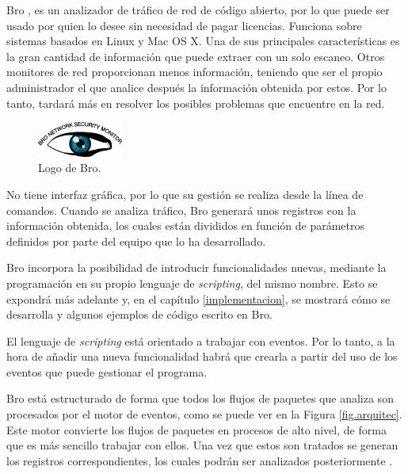 Bro \cite{broindex}, es un analizador de tráfico de red de código abierto, por lo que puede ser usado por quien lo desee 
sin necesidad de pagar licencias. Funciona sobre sistemas basados en Linux y 
Mac OS X. Una de sus principales características es la gran cantidad de información que puede extraer con un solo 
escaneo. Otros monitores de red proporcionan menos información, teniendo que ser el propio administrador el que 
analice después la información obtenida por estos. Por lo tanto, tardará más en resolver los posibles problemas 
que encuentre en la red.

\begin{figure}[H]
  \includegraphics[width=0.25\textwidth]{imagenes/logo-bro.png}
  \centering
  \caption{Logo de Bro.}
\end{figure}

\intro No tiene interfaz gráfica, por lo que su gestión se realiza desde la línea de comandos. Cuando se analiza 
tráfico, Bro generará unos registros con la información obtenida, los cuales están divididos en función de parámetros definidos por 
parte del equipo que lo ha desarrollado.

\intro Bro incorpora la posibilidad de introducir funcionalidades nuevas, mediante la programación en su 
propio lenguaje de \textit{scripting}, del mismo nombre. Esto se expondrá más adelante y, en el capítulo \ref{implementacion}, se 
mostrará cómo se desarrolla y algunos ejemplos de código escrito en Bro.

\intro El lenguaje de \textit{scripting} está orientado a trabajar con eventos. Por lo tanto, a la hora de añadir una nueva 
funcionalidad habrá que crearla a partir del uso de los eventos que puede gestionar el programa.

\intro \noindent Bro está estructurado de forma que todos los flujos de paquetes que analiza son procesados por el motor de eventos, 
como se puede ver en la Figura \ref{fig.arquitec}. Este motor convierte los flujos de paquetes en procesos de alto nivel, de forma que 
es más sencillo trabajar con ellos. Una vez que estos son tratados se generan los registros correspondientes, los cuales 
podrán ser analizados posteriormente \cite{broarquitectura}.

